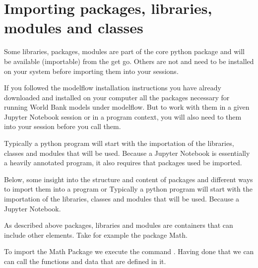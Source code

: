 \documentclass[letterpaper,10pt,english]{jupyterBook}
\begin{document}
\section{Importing packages, libraries, modules and classes}
\label{\detokenize{content/04_PythonEssentials/PythonPackagesEtc:importing-packages-libraries-modules-and-classes}}
\sphinxAtStartPar
Some libraries, packages, modules are part of the core python package and will be available (importable) from the get go.  Others are not and need to be installed on your system before importing them into your sessions.

\sphinxAtStartPar
If you followed the modelflow installation instructions you have already downloaded and installed on your computer all the packages necessary for running World Bank models under modelflow.  But to work with them in a given Jupyter Notebook session or in a program context, you will also need to  them into your session before you call them.

\sphinxAtStartPar
Typically a python program will start with the importation of the libraries, classes and modules that will be used.  Because a Jupyter Notebook is essentially a heavily annotated program, it also requires that packages used be imported.

\sphinxAtStartPar
Below, some insight into the structure and content of packages and different ways to import them into a program or Typically a python program will start with the importation of the libraries, classes and modules that will be used.  Because a Jupyter Notebook.

\sphinxAtStartPar
As described above packages, libraries and modules are containers that can include other elements.  Take for example the package Math.

\sphinxAtStartPar
To import the Math Package we execute the command .  Having done that we can can call the functions and data that are defined in it.
\end{document}
